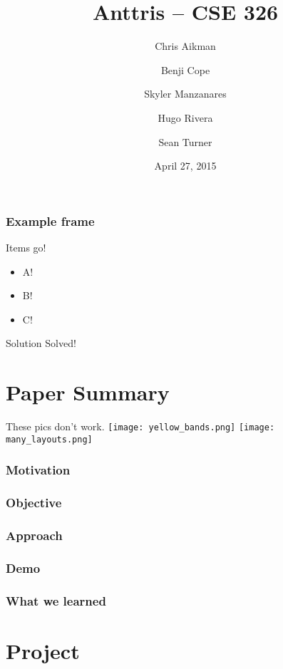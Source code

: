 \documentclass{beamer}
\title{Anttris -- CSE 326}
\author{%
\and Chris Aikman
\and Benji Cope
\and Skyler Manzanares
\and Hugo Rivera
\and Sean Turner}
\date{April 27, 2015}
\begin{document}
\begin{frame}
\titlepage
\end{frame}

\begin{frame}
    \frametitle{Example frame}
    Items go!
\begin{itemize}
\pause \item A!
\pause \item B!
\pause \item C!
\end{itemize}

\begin{alertblock}{Solution}
Solved!
\end{alertblock}

\end{frame}

\section{Paper Summary}
\begin{frame}
    These pics don't work.
\texttt{[image: yellow\_bands.png]}
\pause
\texttt{[image: many\_layouts.png]}
\end{frame}




\begin{frame}
  \frametitle{Motivation} 
\end{frame}


\begin{frame}
  \frametitle{Objective} %
\end{frame}


\begin{frame}
  \frametitle{Approach} %
\end{frame}


\begin{frame}
  \frametitle{Demo} %
\end{frame}


\begin{frame}
  \frametitle{What we learned} %
\end{frame}






\section{Project}
\end{document}
